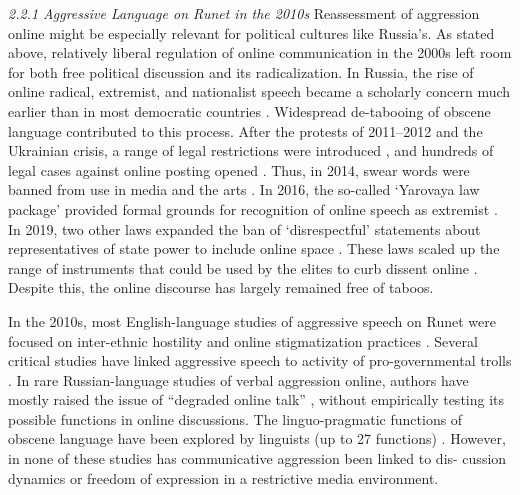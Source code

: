 \textit{2.2.1 Aggressive Language on Runet in the 2010s}
Reassessment of aggression online might be especially relevant for political cultures like Russia’s. As stated above, relatively liberal regulation of online communication in the 2000s \cite{VendilPallin} left room for both free political discussion and its radicalization. In Russia, the rise of online radical, extremist, and nationalist speech became a scholarly concern much earlier than in most democratic countries \cite{EtlingAlexanyanKelly,Kronhaus,SalimovskyErmakova}. Widespread de-tabooing of obscene language contributed to this process. After the protests of 2011--2012 and the Ukrainian crisis, a range of legal restrictions were introduced \cite{LitvinenkoToepfl}, and hundreds of legal cases against online posting opened \cite{Gabdulhakov}. Thus, in 2014, swear words were banned from use in media and the arts \cite{FederalLaw2013}. In 2016, the so-called ‘Yarovaya law package’ provided formal grounds for recognition of online speech as extremist  \cite{FederalLaw2016a,FederalLaw2016b}. In 2019, two other laws expanded the ban of ‘disrespectful’ statements about representatives of state power to include online space \cite{FederalLaw2019a,FederalLaw2019b}. These laws scaled up the range of instruments that could be used by the elites to curb dissent online \cite{LitvinenkoToepfl}. Despite this, the online discourse has largely remained free of taboos.

In the 2010s, most English-language studies of aggressive speech on Runet were focused on inter-ethnic hostility \cite{BodrunovaKoltsovaKoltcov,Koltsova} and online stigmatization practices \cite{DudinaJudinaPlatonov}. Several critical studies have linked aggressive speech to activity of pro-governmental trolls \cite{Zvereva}. In rare Russian-language studies of verbal aggression online, authors have mostly raised the issue of “degraded online talk” \cite[p.~74]{SalimovskyErmakova}, without empirically testing its possible functions in online discussions. The linguo-pragmatic functions of obscene language have been explored by linguists (up to 27 functions) \cite{Havryliv,Zhelvis}. However, in none of these studies has communicative aggression been linked to dis- cussion dynamics or freedom of expression in a restrictive media environment.

